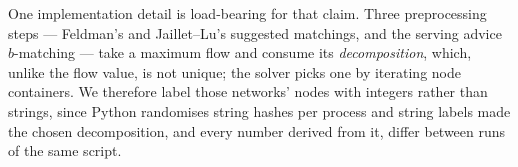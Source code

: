 One implementation detail is load-bearing for that claim. Three
preprocessing steps --- Feldman's and Jaillet--Lu's suggested matchings,
and the serving advice \(b\)-matching --- take a maximum flow and
consume its \emph{decomposition}, which, unlike the flow value, is not
unique; the solver picks one by iterating node containers. We therefore
label those networks' nodes with integers rather than strings, since
Python randomises string hashes per process and string labels made the
chosen decomposition, and every number derived from it, differ between
runs of the same script.
